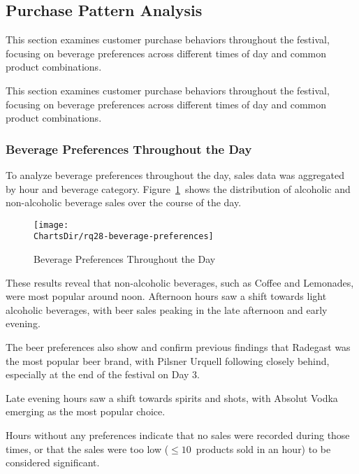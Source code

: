 \subsection{Purchase Pattern Analysis}
\label{subsec:analysis-customer-purchase-pattern}

This section examines customer purchase behaviors throughout the festival, focusing on beverage preferences across different times of day and common product combinations.

This section examines customer purchase behaviors throughout the festival, focusing on beverage preferences across different times of day and common product combinations.


\subsubsection{Beverage Preferences Throughout the Day}
\label{subsubsec:analysis-beverage-preferences}


To analyze beverage preferences throughout the day, sales data was aggregated by hour and beverage category.
Figure~\ref{fig:beverage-preferences}~shows the distribution of alcoholic and non-alcoholic beverage sales over the course of the day.

\begin{figure}[H]
	\centering
	\texttt{[image: \\ChartsDir/rq28-beverage-preferences]}
	\caption{ Beverage Preferences Throughout the Day}
	\label{fig:beverage-preferences}
	\source
\end{figure}

These results reveal that non-alcoholic beverages, such as Coffee and Lemonades, were most popular around noon.
Afternoon hours saw a shift towards light alcoholic beverages, with beer sales peaking in the late afternoon and early evening.

The beer preferences also show and confirm previous findings that Radegast was the most popular beer brand, with Pilsner Urquell following closely behind, especially at the end of the festival on Day 3.

Late evening hours saw a shift towards spirits and shots, with Absolut Vodka emerging as the most popular choice.

Hours without any preferences indicate that no sales were recorded during those times, or that the sales were too low (\(\leq 10\)~products sold in an hour) to be considered significant.

